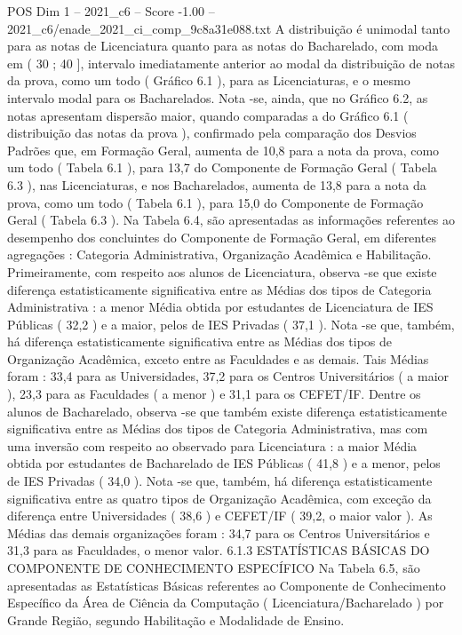 \begin{textsample}{POS Dim 1 – 2021\_c6 – Score -1.00 – 2021\_c6/enade\_2021\_ci\_comp\_9c8a31e088.txt}
A distribuição é unimodal tanto para as notas de Licenciatura quanto para as notas do Bacharelado, com moda em ( 30 ; 40 ], intervalo imediatamente anterior ao modal da distribuição de notas da prova, como um todo ( Gráfico 6.1 ), para as Licenciaturas, e o mesmo intervalo modal para os Bacharelados.
Nota -se, ainda, que no Gráfico 6.2, as notas apresentam dispersão maior, quando comparadas a do Gráfico 6.1 ( distribuição das notas da prova ), confirmado pela comparação dos Desvios Padrões que, em Formação Geral, aumenta de 10,8 para a nota da prova, como um todo ( Tabela 6.1 ), para 13,7 do Componente de Formação Geral ( Tabela 6.3 ), nas Licenciaturas, e nos Bacharelados, aumenta de 13,8 para a nota da prova, como um todo ( Tabela 6.1 ), para 15,0 do Componente de Formação Geral ( Tabela 6.3 ).
Na Tabela 6.4, são apresentadas as informações referentes ao desempenho dos concluintes do Componente de Formação Geral, em diferentes agregações : Categoria Administrativa, Organização Acadêmica e Habilitação.
Primeiramente, com respeito aos alunos de Licenciatura, observa -se que existe diferença estatisticamente significativa entre as Médias dos tipos de Categoria Administrativa : a menor Média obtida por estudantes de Licenciatura de IES Públicas ( 32,2 ) e a maior, pelos de IES Privadas ( 37,1 ).
Nota -se que, também, há diferença estatisticamente significativa entre as Médias dos tipos de Organização Acadêmica, exceto entre as Faculdades e as demais.
Tais Médias foram : 33,4 para as Universidades, 37,2 para os Centros Universitários ( a maior ), 23,3 para as Faculdades ( a menor ) e 31,1 para os CEFET/IF.
Dentre os alunos de Bacharelado, observa -se que também existe diferença estatisticamente significativa entre as Médias dos tipos de Categoria Administrativa, mas com uma inversão com respeito ao observado para Licenciatura : a maior Média obtida por estudantes de Bacharelado de IES Públicas ( 41,8 ) e a menor, pelos de IES Privadas ( 34,0 ).
Nota -se que, também, há diferença estatisticamente significativa entre as quatro tipos de Organização Acadêmica, com exceção da diferença entre Universidades ( 38,6 ) e CEFET/IF ( 39,2, o maior valor ).
As Médias das demais organizações foram : 34,7 para os Centros Universitários e 31,3 para as Faculdades, o menor valor. 6.1.3 ESTATÍSTICAS BÁSICAS DO COMPONENTE DE CONHECIMENTO ESPECÍFICO Na Tabela 6.5, são apresentadas as Estatísticas Básicas referentes ao Componente de Conhecimento Específico da Área de Ciência da Computação ( Licenciatura/Bacharelado ) por Grande Região, segundo Habilitação e Modalidade de Ensino.

\end{textsample}
